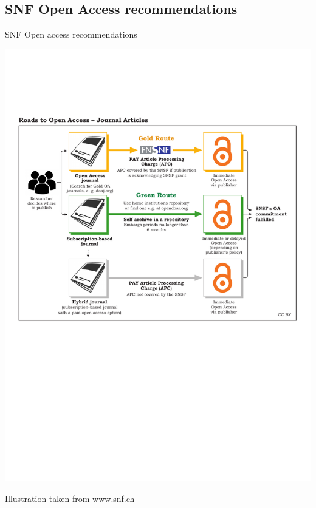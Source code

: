 \documentclass[10pt,compress,serif,aspectratio=169]{beamer}
\begin{document}
\subsection{SNF Open Access recommendations}
\begin{frame}[t]{SNF Open access recommendations}

 \begin{center}
\includegraphics[width=.65\textwidth]{SNSF_Roads_to_OA_Articles}
\end{center}
\href{https://www.snf.ch/en/VyUvGzptStOEpUoC/topic/open-access-to-publications}{Illustration taken from www.snf.ch}

\end{frame}

\end{document}
